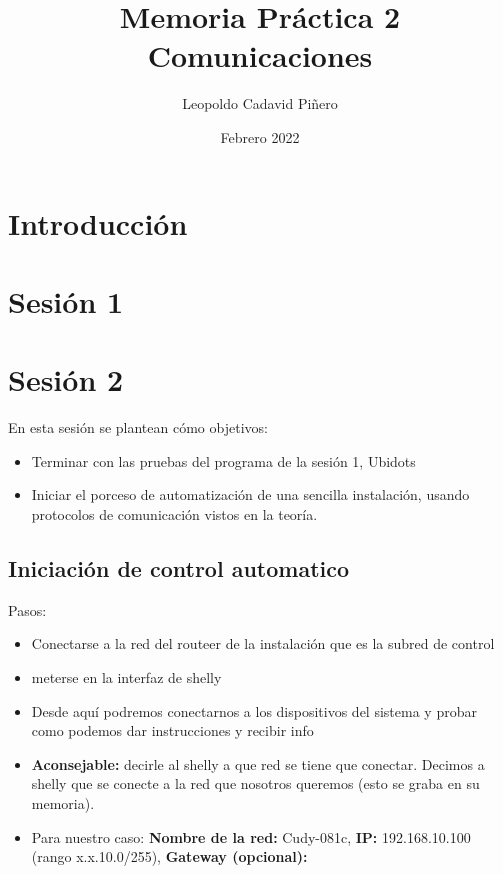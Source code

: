 \documentclass[12pt, a4paper]{article}
\title{Memoria Práctica 2 \\


\large Comunicaciones
}
\author{
Leopoldo Cadavid Piñero
}
\date{Febrero 2022}
\begin{document}
\maketitle
\newpage
\tableofcontents
\newpage
\section{Introducción}
      

\section{Sesión 1}

\section{Sesión 2}
 En esta sesión se plantean cómo objetivos:
 \begin{itemize}
     \item Terminar con las pruebas del programa de la sesión 1, Ubidots
     \item Iniciar el porceso de automatización de una sencilla instalación, usando protocolos de 
        comunicación vistos en la teoría.
    
    
    \end{itemize}

\subsection{Iniciación de control automatico}

Pasos:
\begin{itemize}
    \item Conectarse a la red del routeer de la instalación que es la subred de control
    \item meterse en la  interfaz de shelly
    \item Desde aquí podremos conectarnos a los dispositivos del sistema y probar como podemos dar instrucciones y recibir info
    \item \textbf{Aconsejable:} decirle al shelly a que red se tiene que conectar. Decimos a shelly que se conecte a la red que nosotros queremos
    (esto se graba en su memoria).
    \item Para nuestro caso: \textbf{Nombre de la red:} Cudy-081c, \textbf{IP:} 192.168.10.100 (rango x.x.10.0/255), 
    \textbf{Gateway (opcional):} 
\end{itemize}
\end{document}
